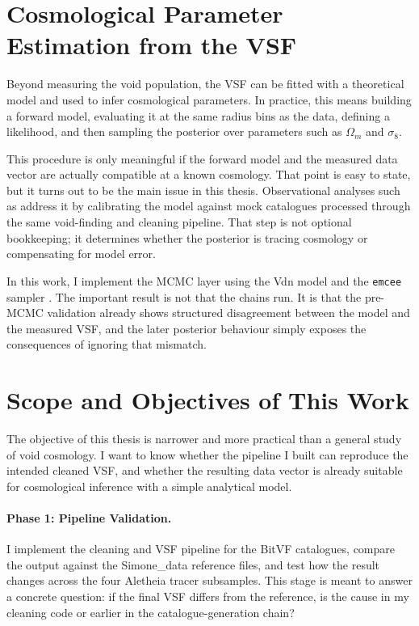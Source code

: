 \documentclass[12pt]{report}
\begin{document}
\section{Cosmological Parameter Estimation from the VSF}
\label{sec:intro_mcmc}

Beyond measuring the void population, the VSF can be fitted with a theoretical model and used to infer cosmological parameters. In practice, this means building a forward model, evaluating it at the same radius bins as the data, defining a likelihood, and then sampling the posterior over parameters such as $\Omega_m$ and $\sigma_8$.

This procedure is only meaningful if the forward model and the measured data vector are actually compatible at a known cosmology. That point is easy to state, but it turns out to be the main issue in this thesis. Observational analyses such as \citet{Contarini2023} address it by calibrating the model against mock catalogues processed through the same void-finding and cleaning pipeline. That step is not optional bookkeeping; it determines whether the posterior is tracing cosmology or compensating for model error.

In this work, I implement the MCMC layer using the Vdn model and the \texttt{emcee} sampler \citep{ForemanMackey2013,GoodmanWeare2010}. The important result is not that the chains run. It is that the pre-MCMC validation already shows structured disagreement between the model and the measured VSF, and the later posterior behaviour simply exposes the consequences of ignoring that mismatch.


\section{Scope and Objectives of This Work}

The objective of this thesis is narrower and more practical than a general study of void cosmology. I want to know whether the pipeline I built can reproduce the intended cleaned VSF, and whether the resulting data vector is already suitable for cosmological inference with a simple analytical model.

\paragraph{Phase 1: Pipeline Validation.} I implement the cleaning and VSF pipeline for the BitVF catalogues, compare the output against the Simone\_data reference files, and test how the result changes across the four Aletheia tracer subsamples. This stage is meant to answer a concrete question: if the final VSF differs from the reference, is the cause in my cleaning code or earlier in the catalogue-generation chain?
\end{document}
